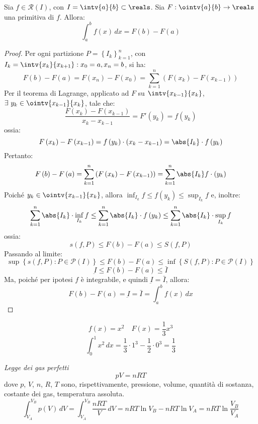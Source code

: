 \begin{theorem}
  Sia $f\in\mathcal{R}\left( I \right)$, con $I=\intv{a}{b}\subset\reals$. Sia $F:\ointv{a}{b}\to\reals$ una primitiva di $f$. Allora:
  $$\int_a^bf\left( x \right)\,dx=F\left( b \right)-F\left( a \right)$$
\end{theorem}
\begin{proof}
  Per ogni partizione $P=\left\{ I_k \right\}_{k=1}^n$, con $I_k=\intv{x_k}{x_{k+1}}:x_0=a,x_n=b$, si ha:
  $$F\left( b \right)-F\left( a \right)=F\left( x_n \right)-F\left( x_0 \right)=\sum_{k=1}^{n}\left( F\left( x_k \right)-F\left( x_{k-1} \right) \right)$$
  Per il teorema di Lagrange, applicato ad $F$ su $\intv{x_{k-1}}{x_k}$, $\exists\ y_k\in\ointv{x_{k-1}}{x_k}$, tale che:
  $$\frac{F\left( x_k \right)-F\left( x_{k-1} \right)}{x_k-x_{k-1 }}=F'\left( y_k \right)=f\left( y_k \right)$$
  ossia:
  $$F\left( x_k \right)-F\left( x_{k-1} \right)=f\left( y_k \right)\cdot\left( x_k-x_{k-1} \right)=\abs{I_k}\cdot f\left( y_k \right)$$
  Pertanto:
  $$F\left( b \right)-F\left( a \right)=\sum_{k=1}^{n}\left( F\left( x_k \right)-F\left( x_{k-1} \right) \right)=\sum_{k=1}^{n}\abs{I_k}f\cdot\left( y_k \right)$$
  Poiché $y_k\in\ointv{x_{k-1}}{x_k}$, allora $\inf_{I_k}f\le f\left( y_k \right)\le \sup_{I_k} f$ e, inoltre:
  $$\sum_{k=1}^{n}\abs{I_k}\cdot\inf_{I_k}f \le\sum_{k=1}^{n}\abs{I_k}\cdot f\left( y_k \right)\le\sum_{k=1}^{n}\abs{I_k}\cdot\sup_{I_k}f$$
  ossia:
  $$s\left( f,P \right)\le F\left( b \right)-F\left( a \right)\le S\left( f,P \right)$$
  Passando al limite:
  $$\sup\left\{ s\left( f,P \right):P\in \mathcal{P}\left( I \right) \right\}\le F\left( b \right)-F\left( a \right)\le \inf\left\{ S\left( f,P \right):P\in \mathcal{P}\left( I \right) \right\}$$
  $$\underbar{I}\le F\left( b \right)-F\left( a \right)\le \bar{I}$$
  Ma, poiché per ipotesi $f$ è integrabile, e quindi $\underbar{I}=\bar{I}$, allora:
  $$F\left( b \right)-F\left( a \right)=\underbar{I}=\bar{I}=\int_a^bf\left( x \right)\,dx$$
\end{proof}

\begin{example}
  $$f\left( x \right)=x^2\quad F\left( x \right)=\frac{1}{3}x^3$$
  $$\int_0^1x^2\,dx=\frac{1}{3}\cdot1^3-\frac{1}{2}\cdot0^3=\frac{1}{3}$$
\end{example}

\begin{example}
  \emph{Legge dei gas perfetti}
  $$pV=nRT$$
  dove $p$, $V$, $n$, $R$, $T$ sono, rispettivamente, pressione, volume, quantità di sostanza, costante dei gas, temperatura assoluta.
  $$\int_{V_A}^{V_B}p\left( V \right)\,dV=\int_{V_A}^{V_B}\frac{nRT}{V}\,dV=nRT\ln V_B-nRT\ln V_A=nRT\ln\frac{V_B}{V_A}$$
\end{example}

